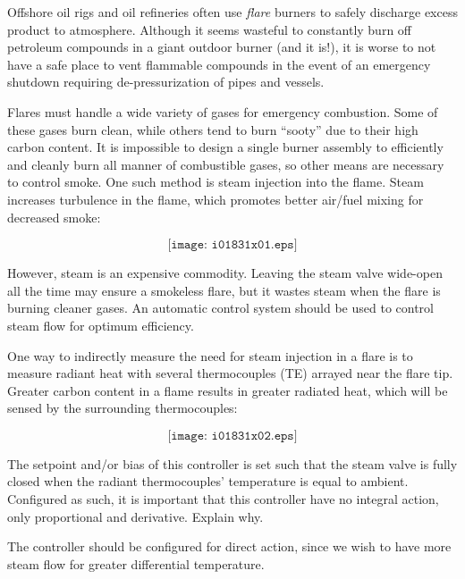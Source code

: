 

Offshore oil rigs and oil refineries often use {\it flare} burners to safely discharge excess product to atmosphere.  Although it seems wasteful to constantly burn off petroleum compounds in a giant outdoor burner (and it is!), it is worse to not have a safe place to vent flammable compounds in the event of an emergency shutdown requiring de-pressurization of pipes and vessels.

Flares must handle a wide variety of gases for emergency combustion.  Some of these gases burn clean, while others tend to burn ``sooty'' due to their high carbon content.  It is impossible to design a single burner assembly to efficiently and cleanly burn all manner of combustible gases, so other means are necessary to control smoke.  One such method is steam injection into the flame.  Steam increases turbulence in the flame, which promotes better air/fuel mixing for decreased smoke:

$$\texttt{[image: i01831x01.eps]}$$

However, steam is an expensive commodity.  Leaving the steam valve wide-open all the time may ensure a smokeless flare, but it wastes steam when the flare is burning cleaner gases.  An automatic control system should be used to control steam flow for optimum efficiency.

One way to indirectly measure the need for steam injection in a flare is to measure radiant heat with several thermocouples (TE) arrayed near the flare tip.  Greater carbon content in a flame results in greater radiated heat, which will be sensed by the surrounding thermocouples:

$$\texttt{[image: i01831x02.eps]}$$

The setpoint and/or bias of this controller is set such that the steam valve is fully closed when the radiant thermocouples' temperature is equal to ambient.  Configured as such, it is important that this controller have no integral action, only proportional and derivative.  Explain why.







The controller should be configured for direct action, since we wish to have more steam flow for greater differential temperature.

